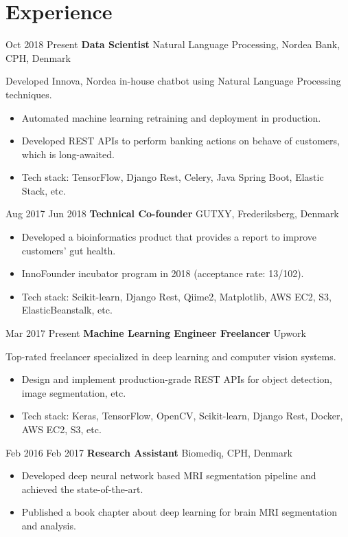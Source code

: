 \documentclass[11pt]{article} %
\begin{document}
{\section{Experience}
\job
{Oct 2018 }{Present}
{\textbf{Data Scientist}}
{}
{Natural Language Processing, Nordea Bank, CPH, Denmark}
{
	Developed Innova, Nordea in-house chatbot using Natural Language Processing techniques.
    \begin{itemize}
    	\itemsep-0.2em
    	\item Automated machine learning retraining and deployment in production.
    	\item Developed REST APIs to perform banking actions on behave of customers, which is long-awaited.
    	\item Tech stack: TensorFlow, Django Rest, Celery, Java Spring Boot, Elastic Stack, etc.
    \end{itemize}
}
\job
{Aug 2017 }{Jun 2018}
{\textbf{Technical Co-founder}}
{}
{GUTXY, Frederiksberg, Denmark}
{
 	\begin{itemize}
		\itemsep-0.2em
		\item Developed a bioinformatics product that provides a report to improve customers' gut health.  
		\item InnoFounder incubator program in 2018 (acceptance rate: 13/102).
		\item Tech stack: Scikit-learn, Django Rest, Qiime2, Matplotlib, AWS EC2, S3, ElasticBeanstalk, etc.
	\end{itemize}

}
\job
{Mar 2017 }{Present}
{\textbf{Machine Learning Engineer Freelancer}}
{}
{Upwork}
{
	Top-rated freelancer specialized in deep learning and computer vision systems.
 	\begin{itemize}
		\itemsep-0.2em
		\item Design and implement production-grade REST APIs for object detection, image segmentation, etc.
		\item Tech stack: Keras, TensorFlow, OpenCV, Scikit-learn, Django Rest, Docker, AWS EC2, S3, etc.
	\end{itemize}
}
\job
{Feb 2016 }{Feb 2017}
{\textbf{Research Assistant}}
{}
{Biomediq, CPH, Denmark}
{
 	\begin{itemize}
		\itemsep-0.2em
		\item Developed deep neural network based MRI segmentation pipeline and achieved the state-of-the-art.
		\item Published a book chapter about deep learning for brain MRI segmentation and analysis.
	\end{itemize}

}}
\end{document}

